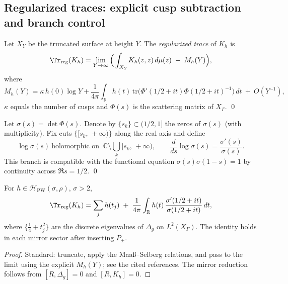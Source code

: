 \subsection{Regularized traces: explicit cusp subtraction and branch control}
\label{subsec:ch6-part1-regtrace} \relax \hspace{0pt}
\begin{definition}
\label{def:cusp-model}
Let $X_Y$ be the truncated surface at height $Y$. The \emph{regularized trace} of $K_h$ is
\[
\Tr_{\mathrm{reg}}(K_h)=\lim_{Y\to\infty}\Big(\int_{X_Y}\!K_h(z,z)\,d\mu(z)\;-\;M_h(Y)\Big),
\]
where
\[
M_h(Y)=\kappa\,h(0)\log Y + \frac{1}{4\pi}\!\int_{\mathbb R} h(t)\,\mathrm{tr}\!\big(\Phi'(1/2+it)\Phi(1/2+it)^{-1}\big)\,dt \ +\ O(Y^{-1}),
\]
$\kappa$ equals the number of cusps and $\Phi(s)$ is the scattering matrix of $X_\Gamma$. \qed
\end{definition}

\begin{definition}
\label{def:branch}
Let $\sigma(s)=\det \Phi(s)$. Denote by $\{s_k\}\subset(1/2,1]$ the zeros of $\sigma(s)$ (with multiplicity). Fix cuts $\{[s_k,\,+\infty)\}$ along the real axis and define
\[
\log\sigma(s)\ \text{holomorphic on }\ \mathbb C\setminus\bigcup_k [s_k,\,+\infty),\qquad \frac{d}{ds}\log\sigma(s)=\frac{\sigma'(s)}{\sigma(s)}.
\]
This branch is compatible with the functional equation $\sigma(s)\sigma(1-s)=1$ by continuity across $\Re s=1/2$. \qed
\end{definition}

\begin{lemma}
\label{lem:reg-spectral}
For $h\in\mathcal H_{\mathrm{PW}}(\sigma,\rho)$, $\sigma>2$,
\[
\Tr_{\mathrm{reg}}(K_h)=\sum_{j} h(t_j)\;+\;\frac{1}{4\pi}\int_{\mathbb R} h(t)\,\frac{\sigma'(1/2+it)}{\sigma(1/2+it)}\,dt,
\]
where $\{\tfrac14+t_j^2\}$ are the discrete eigenvalues of $\Delta_g$ on $L^2(X_\Gamma)$. The identity holds in each mirror sector after inserting $P_\pm$.
\end{lemma}

\begin{proof}
Standard: truncate, apply the Maaß–Selberg relations, and pass to the limit using the explicit $M_h(Y)$; see the cited references. The mirror reduction follows from $[R,\Delta_g]=0$ and $[R,K_h]=0$. %
\end{proof}



